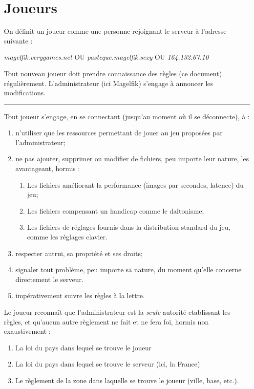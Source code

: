 \section{Joueurs}
\begin{flushleft}
	On d\'efinit un joueur comme une personne rejoignant le serveur \`a l'adresse suivante :
	\begin{center}
		\textit{magelfik.verygames.net}
		OU
		\textit{pasteque.magelfik.sexy}
		OU
		\textit{164.132.67.10}
	\end{center}
	Tout nouveau joueur doit prendre connaissance des r\`egles (ce document) r\'eguli\`erement. L'administrateur (ici Magelfik) s'engage \`a annoncer les modifications. \\
	\noindent\rule{\textwidth}{1pt}
	Tout joueur s'engage, en se connectant (jusqu'au moment o\`u il se d\'econnecte), \`a :
	\begin{enumerate}
		\item n'utiliser que les ressources permettant de jouer au jeu propos\'ees par l'administrateur;
		\item ne pas ajouter, supprimer ou modifier de fichiers, peu importe leur nature, les avantageant, hormis :
		\begin{enumerate}
			\item Les fichiers am\'eliorant la performance (images par secondes, latence) du jeu;
			\item Les fichiers compensant un handicap comme le daltonisme;
			\item Les fichiers de r\'eglages fournis dans la distribution standard du jeu, comme les r\'eglages clavier.
		\end{enumerate}
		\item respecter autrui, sa propri\'et\'e et ses droits;
		\item signaler tout probl\`eme, peu importe sa nature, du moment qu'elle concerne directement le serveur.
		\item imp\'erativement suivre les r\`egles \`a la lettre.
	\end{enumerate}
	Le joueur reconna\^it que l'administrateur est la \textit{seule} autorit\'e etablissant les r\`egles, et qu'aucun autre r\`eglement ne fait et ne fera foi, hormis non exaustivement :
	\begin{enumerate}
		\item La loi du pays dans lequel se trouve le joueur
		\item La loi du pays dans lequel se trouve le serveur (ici, la France)
		\item Le r\`eglement de la zone dans laquelle se trouve le joueur (ville, base, etc.).

\end{enumerate}
\end{flushleft}
